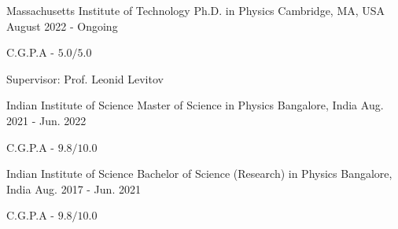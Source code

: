 

\begin{cventries}

    \cventry
	{Massachusetts Institute of Technology} %
	{Ph.D. in Physics} %
	{Cambridge, MA, USA} %
	{August 2022 - Ongoing} %
	{
	\begin{cvitems} %
		\item {C.G.P.A - $5.0/5.0$} \\
	\end{cvitems}
	Supervisor: Prof. Leonid Levitov
	}

    \cventry
	{Indian Institute of Science} %
	{Master of Science in Physics} %
	{Bangalore, India} %
	{Aug. 2021 - Jun. 2022} %
	{
	\begin{cvitems} %
		\item {C.G.P.A - $9.8/10.0$}
	\end{cvitems}
	}

  \cventry
    {Indian Institute of Science} %
    {Bachelor of Science (Research) in Physics} %
    {Bangalore, India} %
    {Aug. 2017 - Jun. 2021} %
    {
      \begin{cvitems} %
        \item {C.G.P.A - $9.8/10.0$}
      \end{cvitems}
    }




\end{cventries}
